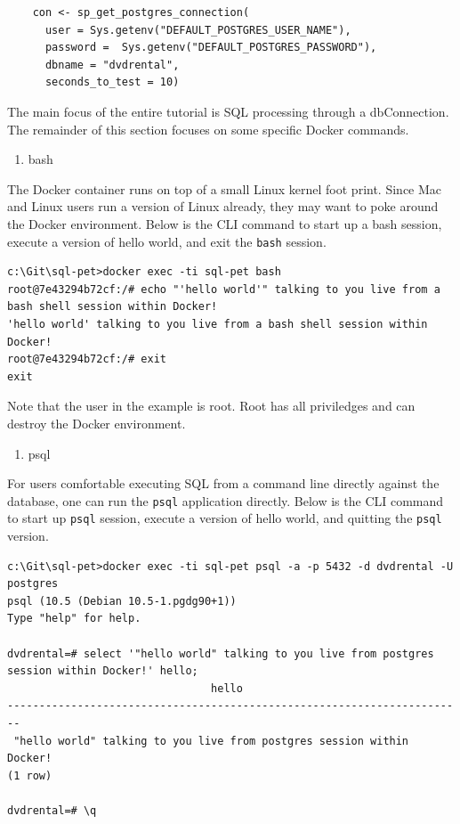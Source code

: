 \documentclass[]{book}
\providecommand{\tightlist}{%
  \setlength{\itemsep}{0pt}\setlength{\parskip}{0pt}}
\theoremstyle{definition}
\theoremstyle{definition}
\theoremstyle{definition}
\theoremstyle{remark}
\begin{document}
\begin{verbatim}
    con <- sp_get_postgres_connection(
      user = Sys.getenv("DEFAULT_POSTGRES_USER_NAME"),
      password =  Sys.getenv("DEFAULT_POSTGRES_PASSWORD"),
      dbname = "dvdrental",
      seconds_to_test = 10)
\end{verbatim}

The main focus of the entire tutorial is SQL processing through a
dbConnection. The remainder of this section focuses on some specific
Docker commands.

\begin{enumerate}
\def\labelenumi{\arabic{enumi}.}
\setcounter{enumi}{1}
\tightlist
\item
  bash
\end{enumerate}

The Docker container runs on top of a small Linux kernel foot print.
Since Mac and Linux users run a version of Linux already, they may want
to poke around the Docker environment. Below is the CLI command to start
up a bash session, execute a version of hello world, and exit the
\texttt{bash} session.

\begin{verbatim}
c:\Git\sql-pet>docker exec -ti sql-pet bash
root@7e43294b72cf:/# echo "'hello world'" talking to you live from a bash shell session within Docker!
'hello world' talking to you live from a bash shell session within Docker!
root@7e43294b72cf:/# exit
exit
\end{verbatim}

Note that the user in the example is root. Root has all priviledges and
can destroy the Docker environment.

\begin{enumerate}
\def\labelenumi{\arabic{enumi}.}
\setcounter{enumi}{2}
\tightlist
\item
  psql
\end{enumerate}

For users comfortable executing SQL from a command line directly against
the database, one can run the \texttt{psql} application directly. Below
is the CLI command to start up \texttt{psql} session, execute a version
of hello world, and quitting the \texttt{psql} version.

\begin{verbatim}
c:\Git\sql-pet>docker exec -ti sql-pet psql -a -p 5432 -d dvdrental -U postgres
psql (10.5 (Debian 10.5-1.pgdg90+1))
Type "help" for help.

dvdrental=# select '"hello world" talking to you live from postgres session within Docker!' hello;
                                hello
------------------------------------------------------------------------
 "hello world" talking to you live from postgres session within Docker!
(1 row)

dvdrental=# \q
\end{verbatim}
\end{document}

